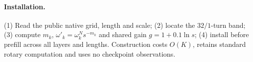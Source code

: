 \paragraph{Installation.}
(1) Read the public native grid, length and scale; (2) locate the $32/1$-turn band; (3) compute $m_k$, $\omega'_k=\omega_k^Ns^{-m_k}$ and shared gain $g=1+0.1\ln s$; (4) install before prefill across all layers and lengths. Construction costs $O(K)$, retains standard rotary computation and uses no checkpoint observations.
